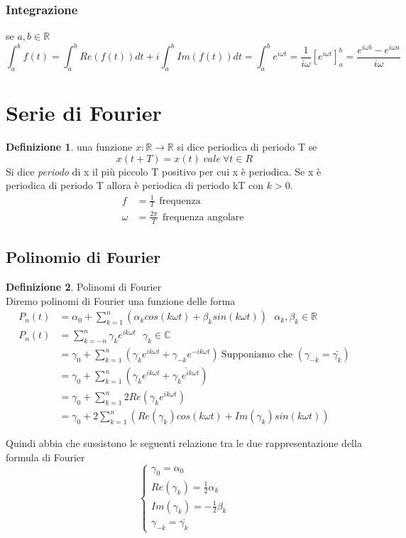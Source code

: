 \documentclass{article}
\theoremstyle{definition}
\newtheorem*{definizione}{Definizione}
\newcommand{\R}{\mathbb{R}}
\newcommand{\ec}{e^{i\omega t}}
\newcommand{\eck}{e^{ik\omega t}}
\begin{document}
\subsubsection{Integrazione}
se $a,b\in \R$ 
$$\int_{a}^{b}f(t)=\int_{a}^{b}Re(f(t)) dt+i\int_{a}^{b}Im(f(t))dt=\int_{a}^{b} \ec =\frac{1}{i\omega }[\ec]_a^b=\frac{e^{i\omega b}-e^{i\omega a}}{i\omega}$$
\newpage
\section{Serie di Fourier}
\begin{definizione}
 una funzione $x:\R \rightarrow \R$ si dice periodica di periodo T se $$x(t+T)=x(t) \ vale \ \forall t \in R $$ Si dice \textit{periodo} di x il più piccolo T positivo per cui x è periodica. Se x è periodica di periodo T allora è periodica di periodo kT con $k>0$. 
 \begin{align*}
 	f&=\frac{1}{T} \ \ \text{frequenza}\\
 	\omega &=\frac{2\pi}{T} \ \ \text{frequenza angolare }
 \end{align*}
 \subsection{Polinomio di Fourier}
 \end{definizione}
 \begin{definizione}
Polinomi di Fourier \\
Diremo polinomi di Fourier una funzione delle forma 
\begin{align*}
	P_n(t)&=\alpha_0+\sum_{k=1}^{n}(\alpha_k cos(k\omega t)+\beta_k sin(k\omega t)) \ \ \ \alpha_k , \beta_k\in \R\\
	P_n(t)&=\sum_{k=-n}^n \gamma_ke^{ik\omega t}   \ \ \ \gamma_k\in \mathbb{C} \\
	&=\gamma_0+\sum_{k=1}^n(\gamma_k \eck +\gamma_{-k} e^{-ik\omega t} ) \ \text{Supponiamo che } (\gamma_{-k}=\bar{\gamma_{k}})\\
	&=\gamma_0+\sum_{k=1}^n(\gamma_k \eck +\overline{\gamma_{k} e^{ik\omega t}})\\
	&=\gamma_0+\sum_{k=1}^n 2 Re(\gamma_{k} \eck) \\
	&=\gamma_0+2 \sum_{k=1}^n (Re(\gamma_{k}) cos(k\omega t)+Im(\gamma_{k}) sin(k\omega t)) 
\end{align*}
 \end{definizione}
Quindi abbia che sussistono le seguenti relazione tra le due rappresentazione della formula di Fourier 
$$
\begin{cases}
\gamma_0=\alpha_0\\
Re(\gamma_{k})=\frac{1}{2}\alpha_k\\
Im(\gamma_{k})=-\frac{1}{2}\beta_k\\
\gamma_{-k}=\overline{\gamma_{k}}
\end{cases}
$$
\end{document}
